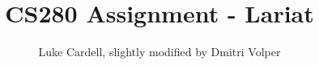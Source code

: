 \documentclass{article}
\title{CS280 Assignment - Lariat}
\date{ }
\author{Luke Cardell, slightly modified by Dmitri Volper}
\theoremstyle{plain}
\theoremstyle{definition}
\begin{document}
\maketitle


\pagebreak
\tableofcontents
\pagebreak




\end{document}
